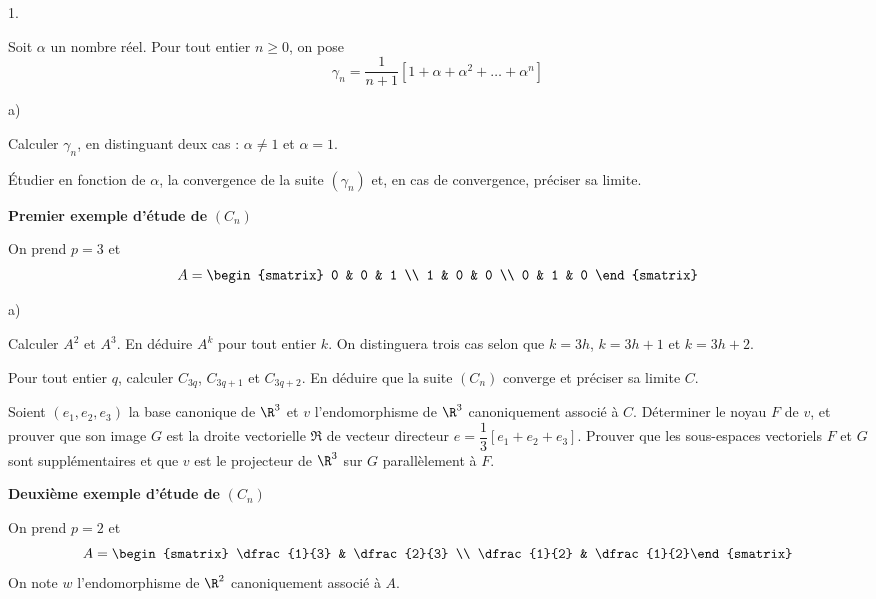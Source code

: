 \documentclass[11pt]{article}%
\begin{document}
\begin{noliste}{1.}
 \setlength{\itemsep}{4mm}
\item Soit $\alpha $ un nombre réel. Pour tout entier $n\geq 0$, on
pose 
\[
\gamma_{n} = \dfrac{1}{n + 1}\left[ 1 + \alpha + \alpha ^{2} + \ldots +
\alpha ^{n}\right] 
\]

\begin{noliste}{a)}
 \setlength{\itemsep}{2mm}
\item Calculer $\gamma_{n}$, en distinguant deux cas : $\alpha \neq 1$
et $\alpha = 1$. 

\item Étudier en fonction de $\alpha $, la convergence de la suite
$(\gamma
_{n})$ et, en cas de convergence, préciser sa limite. 
\end{noliste}

\item \textbf{Premier exemple d'étude de }$(C_{n})$

On prend $p = 3$ et 
\[
A = 
\begin{smatrix}
0 & 0 & 1 \\
1 & 0 & 0 \\
0 & 1 & 0
\end{smatrix}
\]

\begin{noliste}{a)}
 \setlength{\itemsep}{2mm}
\item Calculer $A^{2}$ et $A^{3}$. En déduire $A^{k}$ pour tout entier
$k$.
On distinguera trois cas selon que $k = 3h$, $k = 3h + 1$ et $k = 3h +
2$. 

\item Pour tout entier $q$, calculer $C_{3q}$, $C_{3q + 1}$ et $C_{3q +
2}$. En déduire que la suite $(C_{n})$ converge et préciser sa limite
$C$. 

\item Soient $(e_{1},e_{2},e_{3})$ la base canonique de $\R^{3}$ et $v$
l'endomorphisme de $\R^{3}$ canoniquement associé à $C$. Déterminer le
noyau $F$ de $v$, et prouver que son image $G$ est la droite
vectorielle $\Re$ de vecteur directeur $e = \dfrac{1}{3}\left[
e_{1} + e_{2} + e_{3}\right] $. Prouver que les sous-espaces vectoriels
$F$ et $G
$ sont supplémentaires et que $v$ est le projecteur de $\R^{3}$ sur $G$
parallèlement à $F$. 
\end{noliste}

\item \textbf{Deuxième exemple d'étude de }$(C_{n})$

On prend $p = 2$ et 
\[
A = 
\begin{smatrix}
\dfrac{1}{3} & \dfrac{2}{3} \\
\dfrac{1}{2} & \dfrac{1}{2}\end{smatrix}
\]
On note $w$ l'endomorphisme de $\R^{2}$ canoniquement associé à $A$. 


\end{noliste}
\end{document}
